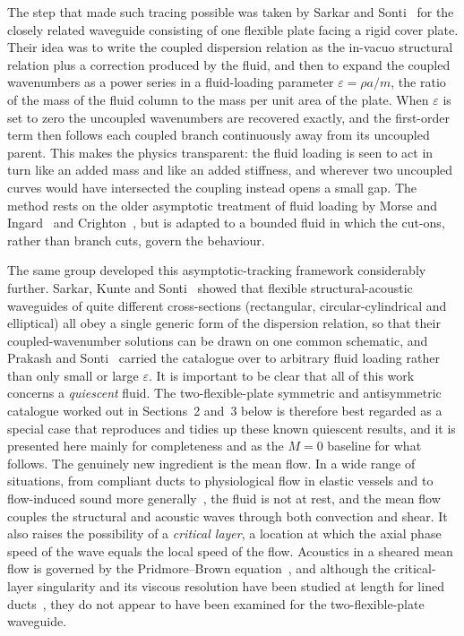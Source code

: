 \documentclass[11pt]{article}
\newcommand{\eps}{\varepsilon}
\begin{document}
The step that made such tracing possible was taken by Sarkar and Sonti~\cite{sarkarsonti} for the
closely related waveguide consisting of one flexible plate facing a rigid cover plate. Their idea was to
write the coupled dispersion relation as the in-vacuo structural relation plus a correction produced by
the fluid, and then to expand the coupled wavenumbers as a power series in a fluid-loading parameter
$\eps=\rho a/m$, the ratio of the mass of the fluid column to the mass per unit area of the plate. When
$\eps$ is set to zero the uncoupled wavenumbers are recovered exactly, and the first-order term then
follows each coupled branch continuously away from its uncoupled parent. This makes the physics
transparent: the fluid loading is seen to act in turn like an added mass and like an added stiffness,
and wherever two uncoupled curves would have intersected the coupling instead opens a small gap. The
method rests on the older asymptotic treatment of fluid loading by Morse and Ingard~\cite{morseingard}
and Crighton~\cite{crighton}, but is adapted to a bounded fluid in which the cut-ons, rather than branch
cuts, govern the behaviour.

The same group developed this asymptotic-tracking framework considerably further. Sarkar, Kunte and
Sonti~\cite{kunte2011} showed that flexible structural-acoustic waveguides of quite different
cross-sections (rectangular, circular-cylindrical and elliptical) all obey a single generic form of the
dispersion relation, so that their coupled-wavenumber solutions can be drawn on one common schematic,
and Prakash and Sonti~\cite{prakash2016} carried the catalogue over to arbitrary fluid loading rather
than only small or large $\eps$. It is important to be clear that all of this work concerns a
\emph{quiescent} fluid. The two-flexible-plate symmetric and antisymmetric catalogue worked out in
Sections~2 and~3 below is therefore best regarded as a special case that reproduces and tidies up these
known quiescent results, and it is presented here mainly for completeness and as the $M=0$ baseline for
what follows. The genuinely new ingredient is the mean flow. In a wide range of situations, from
compliant ducts to physiological flow in elastic vessels and to flow-induced sound more
generally~\cite{morab}, the fluid is not at rest, and the mean flow couples the structural and acoustic
waves through both convection and shear. It also raises the possibility of a \emph{critical layer},
a location at which the axial phase speed of the wave equals the local speed of the flow. Acoustics in a
sheared mean flow is governed by the Pridmore--Brown equation~\cite{pridmorebrown}, and although the
critical-layer singularity and its viscous resolution have been studied at length for lined
ducts~\cite{brambley,brambleydarau,maslowe}, they do not appear to have been examined for the
two-flexible-plate waveguide.
\end{document}
